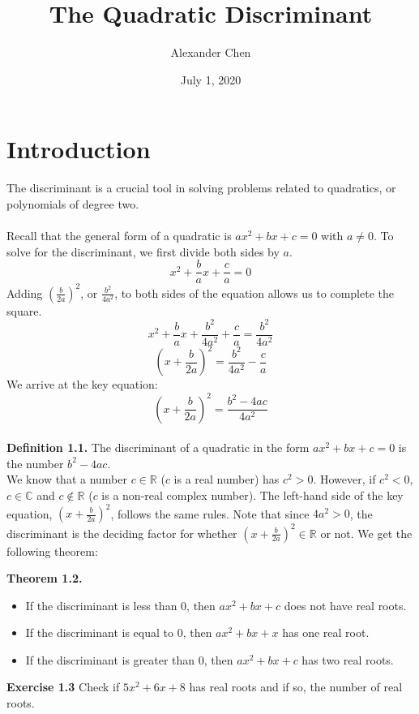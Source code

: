 \documentclass{article}
\title{The Quadratic Discriminant}
\author{Alexander Chen}
\date{July 1, 2020}
\begin{document}
\maketitle

\section{Introduction}
The discriminant is a crucial tool in solving problems related to quadratics, or polynomials of degree two.\\\\

Recall that the general form of a quadratic is $ax^2+bx+c=0$ with $a\neq0$. To solve for the discriminant, we first divide both sides by $a$. $$x^2+\frac{b}{a}x+\frac{c}{a}=0$$
Adding $(\frac{b}{2a})^2$, or $\frac{b^2}{4a^2}$, to both sides of the equation allows us to complete the square.
$$x^2+\frac{b}{a}x+\frac{b^2}{4a^2}+\frac{c}{a}=\frac{b^2}{4a^2}$$
$$(x+\frac{b}{2a})^2=\frac{b^2}{4a^2}-\frac{c}{a}$$
We arrive at the key equation:
$$(x+\frac{b}{2a})^2=\frac{b^2-4ac}{4a^2}$$\\

\textbf{Definition 1.1.} The discriminant of a quadratic in the form $ax^2+bx+c=0$ is the number $b^2-4ac$.\\

We know that a number $c \in \mathbb{R}$ ($c$ is a real number) has $c^2>0$. However, if $c^2<0$, $c \in \mathbb{C}$ and $c \not\in \mathbb{R}$ ($c$ is a non-real complex number). The left-hand side of the key equation, $(x+\frac{b}{2a})^2$, follows the same rules. Note that since $4a^2 > 0$, the discriminant is the deciding factor for whether $(x+\frac{b}{2a})^2 \in \mathbb{R}$ or not. We get the following theorem:\\

\begin{mdframed}
    \textbf{Theorem 1.2.}
    \begin{itemize}
        \item If the discriminant is less than 0, then $ax^2+bx+c$ does not have real roots.
        \item If the discriminant is equal to 0, then $ax^2+bx+x$ has one real root.
        \item If the discriminant is greater than 0, then $ax^2+bx+c$ has two real roots.
    \end{itemize}
\end{mdframed}

\textbf{Exercise 1.3} Check if $5x^2+6x+8$ has real roots and if so, the number of real roots.
\end{document}
